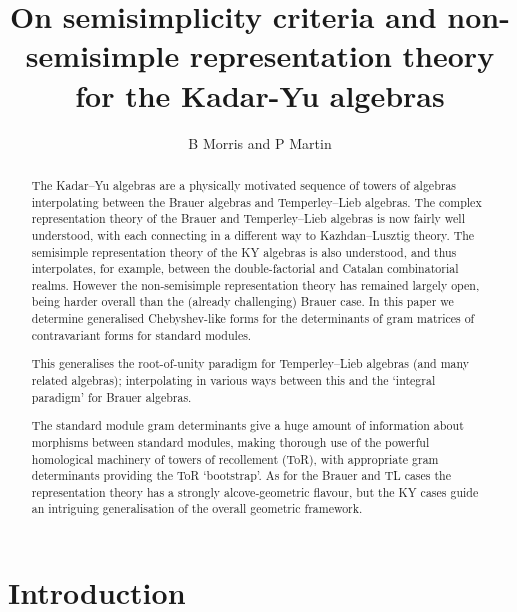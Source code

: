 \documentclass{article}
\title{
On semisimplicity criteria and non-semisimple representation theory for 
the Kadar-Yu algebras}
\author{B Morris and P Martin}   %
\theoremstyle{definition}
\numberwithin{equation}{subsection}
\begin{document}
\maketitle
\begin{abstract}
    The Kadar--Yu algebras are a physically motivated sequence of towers of algebras interpolating between the Brauer algebras and Temperley--Lieb algebras. 
    The complex representation theory of the Brauer and Temperley--Lieb algebras is now fairly well understood, with each connecting in a different way to Kazhdan--Lusztig theory. 
    The semisimple representation theory of the KY algebras is also understood, and thus interpolates, for example, between the double-factorial and Catalan combinatorial realms. However the non-semisimple representation theory has remained largely open, being harder overall than the (already challenging) Brauer case. 
    In this paper we determine generalised Chebyshev-like forms for the determinants of gram matrices 
    of contravariant forms for standard modules. 

    This generalises the root-of-unity paradigm for Temperley--Lieb algebras (and many related algebras); interpolating in various ways between this and the `integral paradigm' for Brauer algebras. 
    
    The standard module gram determinants give 
    a huge amount of information about morphisms between standard modules, making thorough use of the powerful homological machinery of towers of recollement (ToR), with 
    appropriate gram determinants providing the ToR `bootstrap'. As for the Brauer and TL cases the representation theory has a strongly alcove-geometric flavour, but the KY cases guide an intriguing generalisation of the overall geometric framework.  
\end{abstract}
\newpage 
\tableofcontents 




\section{Introduction}   \label{ss:intro}
\end{document}

